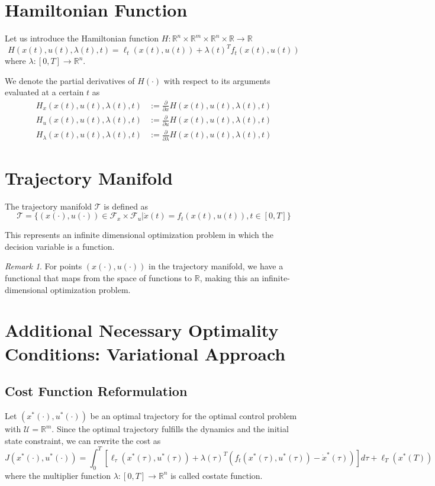 \documentclass[openany]{book}
\theoremstyle{definition}
\theoremstyle{remark}
\newtheorem*{remark}{Remark}
\begin{document}
\section{Hamiltonian Function}
Let us introduce the Hamiltonian function $H: \mathbb{R}^n \times \mathbb{R}^m \times \mathbb{R}^n \times \mathbb{R} \to \mathbb{R}$
\[
    H(x(t),u(t),\lambda(t),t) = \ell_t(x(t),u(t)) + \lambda(t)^T f_t(x(t),u(t))
\]
where $\lambda:[0,T] \to \mathbb{R}^n$.

We denote the partial derivatives of $H(\cdot)$ with respect to its arguments evaluated at a certain $t$ as
\begin{align*}
    H_x(x(t),u(t),\lambda(t),t) &:= \frac{\partial}{\partial x}H(x(t),u(t),\lambda(t),t)\\
    H_u(x(t),u(t),\lambda(t),t) &:= \frac{\partial}{\partial u}H(x(t),u(t),\lambda(t),t)\\
    H_\lambda(x(t),u(t),\lambda(t),t) &:= \frac{\partial}{\partial \lambda}H(x(t),u(t),\lambda(t),t)
\end{align*}

\section{Trajectory Manifold}
The trajectory manifold $\mathcal{T}$ is defined as
\[
    \mathcal{T} = \{(x(\cdot),u(\cdot)) \in \mathcal{F}_x \times \mathcal{F}_u | \dot{x}(t) = f_t(x(t),u(t)), t \in [0,T]\}
\]

This represents an infinite dimensional optimization problem in which the decision variable is a function.

\begin{remark}
For points $(x(\cdot),u(\cdot))$ in the trajectory manifold, we have a functional that maps from the space of functions to $\mathbb{R}$, making this an infinite-dimensional optimization problem.
\end{remark}
\section{Additional Necessary Optimality Conditions: Variational Approach}

\subsection{Cost Function Reformulation}
Let $(x^*(\cdot),u^*(\cdot))$ be an optimal trajectory for the optimal control problem with $\mathcal{U} = \mathbb{R}^m$. Since the optimal trajectory fulfills the dynamics and the initial state constraint, we can rewrite the cost as
\[
    J(x^*(\cdot),u^*(\cdot)) = \int_0^T[\ell_\tau(x^*(\tau),u^*(\tau)) + \lambda(\tau)^T(f_t(x^*(\tau),u^*(\tau)) - \dot{x}^*(\tau))]d\tau + \ell_T(x^*(T))
\]
where the multiplier function $\lambda:[0,T]\to\mathbb{R}^n$ is called costate function.
\end{document}
